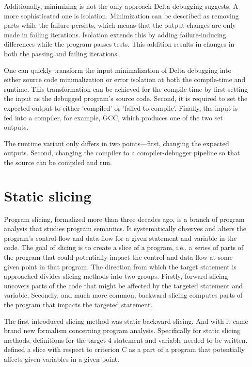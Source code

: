 Additionally, minimizing is not the only approach Delta debugging suggests.
A more sophisticated one is isolation. Minimization can be described as removing parts
while the failure persists, which means that the output changes are only made in failing
iterations.
Isolation extends this by adding failure-inducing differences while the program passes tests.
This addition results in changes in both the passing and failing iterations.

One can quickly transform the input minimalization of Delta debugging into either source
code minimalization or error isolation at both the compile-time and runtime.
This transformation can be achieved for the compile-time by first setting the input
as the debugged program's source code. 
Second, it is required to set the expected
output to either 'compiled' or 'failed to compile'. 
Finally, the input is fed into a compiler, for example, GCC, which produces
one of the two set outputs. 

The runtime variant only differs in two points—first, changing the expected outputs. 
Second, changing the compiler to a compiler-debugger pipeline so that the source 
can be compiled and run.

\section{Static slicing}

Program slicing, formalized more than three decades ago,
is a branch of program analysis that studies program semantics.
It systematically observes and alters the program's control-flow
and data-flow for a given statement and variable in the code.  
The goal of slicing is to create a slice of a program,
i.e., a series of parts of the program that could potentially
impact the control and data flow at some given point in that program. 
The direction from which the target statement is approached divides 
slicing methods into two groups. 
Firstly, forward slicing uncovers parts of the code that 
might be affected by the targeted statement and variable. 
Secondly, and much more common, backward slicing computes 
parts of the program that impacts the targeted statement.

The first introduced slicing method was static backward slicing.
And with it came brand new formalism concerning program analysis. 
Specifically for static slicing methods, definitions for the target 4
statement and variable needed to be written.
\citet{Weiser84}
defined a slice with respect to criterion C 
as a part of a program that potentially affects given variables in a given point. 

